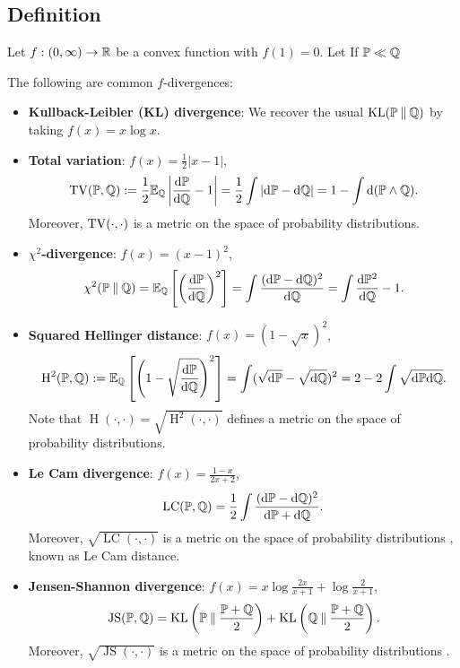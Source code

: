 \subsection{Definition}
\begin{definition}
    Let $f:(0,\infty)\to\mathbb{R}$ be a convex function with $f(1)=0$.
    Let 
    If $\mathbb{P}\ll\mathbb{Q}$                        
\end{definition}

The following are common $f$-divergences:
\begin{itemize}
    \item \textbf{Kullback-Leibler (KL) divergence}: We recover the usual $\operatorname{KL}(\mathbb{P}\mathbin{\|}\mathbb{Q})$ by taking $f(x)=x\log x$.
    \item \textbf{Total variation}: $f(x)=\frac{1}{2}|x-1|$, \[\operatorname{TV}(\mathbb{P},\mathbb{Q}):=\frac{1}{2}\mathbb{E}_{\mathbb{Q}}\left|\frac{\mathrm{d}\mathbb{P}}{\mathrm{d}\mathbb{Q}}-1\right|=\frac{1}{2}\int|\mathrm{d}\mathbb{P}-\mathrm{d}\mathbb{Q}|=1-\int\mathrm{d}(\mathbb{P}\wedge\mathbb{Q}).\] Moreover, $\operatorname{TV}(\cdot,\cdot)$ is a metric on the space of probability distributions.
    \item \textbf{$\chi^2$-divergence}: $f(x)=(x-1)^2$, \[\chi^2(\mathbb{P}\mathbin{\|}\mathbb{Q})=\mathbb{E}_{\mathbb{Q}}\left[\left(\frac{\mathrm{d}\mathbb{P}}{\mathrm{d}\mathbb{Q}}\right)^2\right]=\int\frac{(\mathrm{d}\mathbb{P}-\mathrm{d}\mathbb{Q})^2}{\mathrm{d}\mathbb{Q}}=\int\frac{\mathrm{d}\mathbb{P}^2}{\mathrm{d}\mathbb{Q}}-1.\]
    \item \textbf{Squared Hellinger distance}: $f(x)=(1-\sqrt{x})^2$, \[\operatorname{H}^2(\mathbb{P},\mathbb{Q}):=\mathbb{E}_{\mathbb{Q}}\left[\left(1-\sqrt{\frac{\mathrm{d}\mathbb{P}}{\mathrm{d}\mathbb{Q}}}\right)^2\right]=\int(\sqrt{\mathrm{d}\mathbb{P}}-\sqrt{\mathrm{d}\mathbb{Q}})^2=2-2\int\sqrt{\mathrm{d}\mathbb{P}\mathrm{d}\mathbb{Q}}.\] Note that $\operatorname{H}(\cdot,\cdot)=\sqrt{\operatorname{H} ^2(\cdot,\cdot)}$ defines a metric on the space of probability distributions.
    \item \textbf{Le Cam divergence}: $f(x)=\frac{1-x}{2x+2}$, \[\operatorname{LC}(\mathbb{P},\mathbb{Q})=\frac{1}{2}\int\frac{(\mathrm{d}\mathbb{P}-\mathrm{d}\mathbb{Q})^2}{\mathrm{d}\mathbb{P}+\mathrm{d}\mathbb{Q}}.\] Moreover, $\sqrt{\operatorname{LC}(\cdot,\cdot)}$ is a metric on the space of probability distributions \citep{endres2003new}, known as Le Cam distance.
    \item \textbf{Jensen-Shannon divergence}: $f(x)=x\log\frac{2x}{x+1}+\log\frac{2}{x+1}$, \[\operatorname{JS}(\mathbb{P},\mathbb{Q})=\operatorname{KL}\left(\mathbb{P}\mathbin{\|}\frac{\mathbb{P}+\mathbb{Q}}{2}\right)+\operatorname{KL}\left(\mathbb{Q}\mathbin{\|}\frac{\mathbb{P}+\mathbb{Q}}{2}\right).\] Moreover, $\sqrt{\operatorname{JS}(\cdot,\cdot)}$ is a metric on the space of probability distributions \citep{endres2003new}.
\end{itemize}

\begin{example}
    
\end{example}

